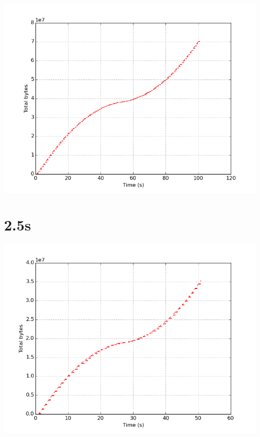 \documentclass{article}
\begin{document}
    \begin{center}
    \includegraphics{set_a_5s/set_a_5s.png}
    \end{center}
\clearpage

\section{2.5s}
    \noindent\begin{minipage}{.45\textwidth}
    
    \end{minipage}\hfill
    \begin{minipage}{.45\textwidth}
    
    \end{minipage}
    
    \begin{center}
    \includegraphics{set_a_2.5s/set_a_2_5s.png}
    \end{center}
\clearpage
\end{document}
